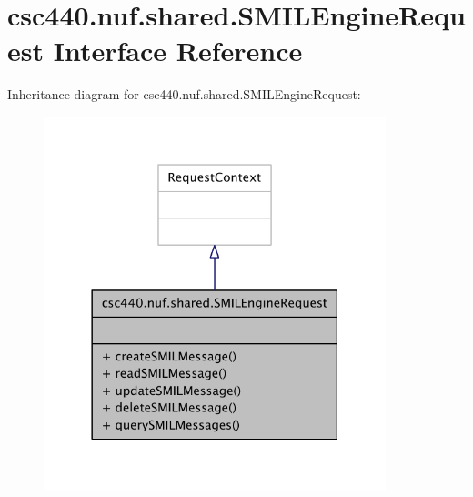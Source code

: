 \hypertarget{interfacecsc440_1_1nuf_1_1shared_1_1_s_m_i_l_engine_request}{\section{csc440.\-nuf.\-shared.\-S\-M\-I\-L\-Engine\-Request Interface Reference}
\label{interfacecsc440_1_1nuf_1_1shared_1_1_s_m_i_l_engine_request}
}


Inheritance diagram for csc440.\-nuf.\-shared.\-S\-M\-I\-L\-Engine\-Request\-:
\nopagebreak
\begin{figure}[H]
\begin{center}
\leavevmode
\includegraphics[width=282pt]{interfacecsc440_1_1nuf_1_1shared_1_1_s_m_i_l_engine_request__inherit__graph}
\end{center}
\end{figure}


